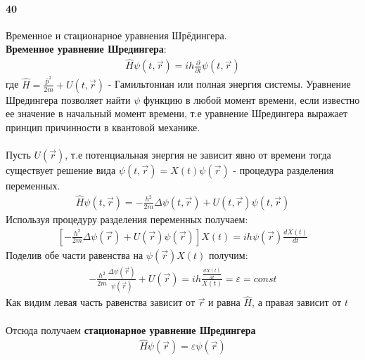 



\paragraph{40}
Временное и стационарное уравнения Шрёдингера.\\

\textbf{Временное уравнение Шредингера}:
\begin{gather*}
	\hat{H}\psi(t,\vec{r}) = ih\frac{\partial}{\partial t}\psi(t,\vec{r})
\end{gather*}
где $\hat{H} = \frac{\hat{p}^2}{2m}+U(t,\vec{r})$ - Гамильтониан или полная энергия системы.
Уравнение Шредингера позволяет найти $\psi$ функцию в любой момент времени, если известно ее значение в начальный момент времени, т.е уравнение Шредингера выражает принцип причинности в квантовой механике.\\\\
Пусть $U(\vec{r})$, т.е потенциальная энергия не зависит явно от времени тогда существует решение вида $\psi(t,\vec{r})=X(t)\psi(\vec{r})$ - процедура разделения переменных.
\begin{gather*}
	\hat{H}\psi(t,\vec{r})=-\frac{h^2}{2m}\Delta\psi(t,\vec{r})+U(t,\vec{r})\psi(t,\vec{r})
\end{gather*}
Используя процедуру разделения переменных получаем:
\begin{gather*}
\left[-\frac{h^2}{2m}\Delta\psi(\vec{r})+U(\vec{r})\psi(\vec{r})\right]X(t)=ih\psi(\vec{r})\frac{dX(t)}{dt}
\end{gather*}
Поделив обе части равенства на $\psi(\vec{r})X(t)$ получим:
\begin{gather*}
-\frac{h^2}{2m}\frac{\Delta\psi(\vec{r})}{\psi(\vec{r})}+U(\vec{r})=ih\frac{\frac{dX(t)}{dt}}{X(t)} = \varepsilon = const
\end{gather*}
Как видим левая часть равенства зависит от $\vec{r}$ и равна $\hat{H}$, а правая зависит от $t$\\\\
Отсюда получаем \textbf{стационарное уравнение Шредингера}
\begin{gather*}
	\hat{H}\psi(\vec{r}) = \varepsilon\psi(\vec{r})
\end{gather*}


